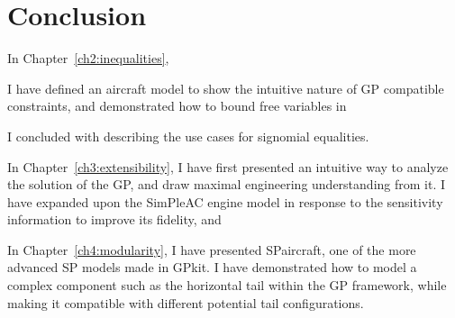 \chapter{Conclusion}
\label{ch5:conclusion}


In Chapter~\ref{ch2:inequalities},

I have defined an aircraft model to show the intuitive nature of \gls{GP}
compatible constraints, and demonstrated how to bound free variables in

I concluded with describing the use cases for signomial equalities.

In Chapter~\ref{ch3:extensibility}, I have first presented an intuitive
way to analyze the solution of the \gls{GP}, and draw maximal engineering
understanding from it. I have expanded upon the SimPleAC engine model
in response to the sensitivity information to improve its fidelity,
and

In Chapter~\ref{ch4:modularity}, I have presented SPaircraft, one of the more
advanced \gls{SP} models made in GPkit. I have demonstrated how to model
a complex component such as the horizontal tail within the GP framework,
while making it compatible with different potential tail configurations.

